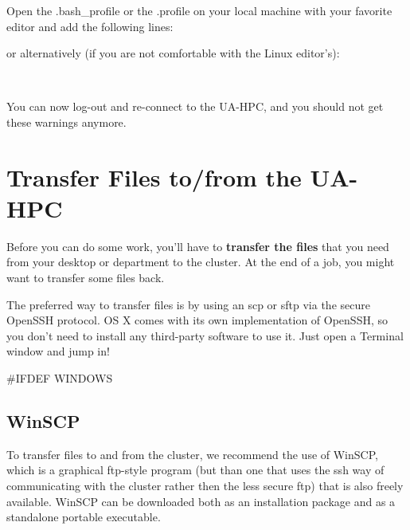 Open the  .bash\_profile or the .profile on your local machine with your favorite editor and add the following lines:


or alternatively (if you are not comfortable with the Linux editor's):

\begin{prompt}
$ %
$ %
$ %
$ %
\end{prompt}

You can now log-out and re-connect to the UA-HPC, and you should not get these warnings anymore.

\section{Transfer Files to/from the UA-HPC}

Before you can do some work, you'll have to \textbf{transfer the files} that you need from your desktop or department to the cluster. At the end of a job, you might want to transfer some files back.

The preferred way to transfer files is by using an scp or sftp via the secure OpenSSH protocol.  OS X comes with its own implementation of OpenSSH, so you don't need to install any third-party software to use it. Just open a Terminal window and jump in!

\#IFDEF WINDOWS

\subsection{WinSCP}

To transfer files to and from the cluster, we recommend the use of WinSCP, which is a graphical ftp-style program (but than one that uses the ssh way of communicating with the cluster rather then the less secure ftp) that is also freely available. WinSCP can be downloaded both as an installation package and as a standalone portable executable.

